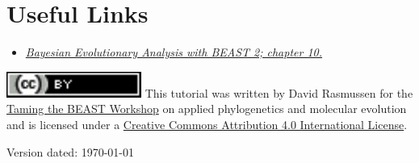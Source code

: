 \documentclass[11pt]{article}
\begin{document}
\bigskip
\section{Useful Links}

\begin{itemize}
\item \href{http://www.beast2.org/book.html}{\textit{Bayesian Evolutionary Analysis with BEAST 2; chapter 10.}}  \citep{BEAST2book2014}
\end{itemize}


\href{http://creativecommons.org/licenses/by/4.0/}{\includegraphics[scale=0.8]{figures/ccby.pdf}} This tutorial was written by David Rasmussen for the \href{https://www.bsse.ethz.ch/cevo/taming-the-beast.html}{Taming the BEAST Workshop} on applied phylogenetics and molecular evolution and is licensed under a \href{http://creativecommons.org/licenses/by/4.0/}{Creative Commons Attribution 4.0 International License}. 



Version dated: \today







\printbibliography[heading=relevref]
\end{document}
